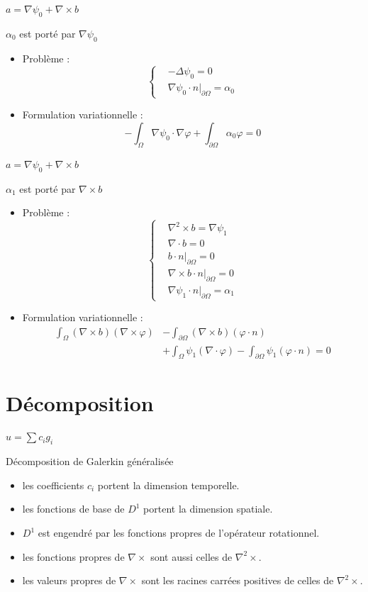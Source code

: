 \documentclass{beamer}
\newcommand{\grad}{{\nabla}}
\newcommand{\laplace}{{\Delta}}
\newcommand{\rot}{{\nabla\times}}
\newcommand{\rott}{{\nabla^2\times}}
\newcommand{\diverg}{{\nabla\cdot}}
\newcommand{\restr}{{\big\rvert_{\partial\Omega}}}
\begin{document}
\begin{frame}{$a=\grad\psi_0+\rot b$}
\begin{block}{$\alpha_0$ est porté par $\grad\psi_0$}
\begin{itemize}
\item Problème :
\[\left\{
\begin{aligned}
&-\laplace\psi_0 = 0\\
&\grad\psi_0\cdot n\restr=\alpha_0
\end{aligned}
\right.\]
\item Formulation variationnelle :
\[
-\int_\Omega \grad\psi_0\cdot\grad\varphi + \int_{\partial\Omega} \alpha_0\varphi = 0
\]
\end{itemize}
\end{block}
\end{frame}

\begin{frame}{$a=\grad\psi_0+\rot b$}
\begin{block}{$\alpha_1$ est porté par $\rot b$}
\begin{itemize}
\item Problème :
\[\left\{
\begin{aligned}
&\rott b = \grad\psi_1\\
&\diverg b = 0\\
&b\cdot n\restr = 0\\
&\rot b\cdot n\restr = 0\\
&\grad\psi_1\cdot n\restr = \alpha_1
\end{aligned}
\right.\]
\item Formulation variationnelle :
\begin{align*}
\int_\Omega (\rot b)(\rot\varphi) &- \int_{\partial\Omega} (\rot b)(\varphi\cdot n) \\
&+\int_\Omega \psi_1(\diverg\varphi) - \int_{\partial\Omega} \psi_1(\varphi\cdot n) = 0
\end{align*}
\end{itemize}
\end{block}
\end{frame}

\section{Décomposition}
\begin{frame}{$u=\sum c_ig_i$}
\begin{block}{Décomposition de Galerkin généralisée}
\begin{itemize}
\item les coefficients $c_i$ portent la dimension temporelle.
\item les fonctions de base de $D^1$ portent la dimension spatiale.
\item $D^1$ est engendré par les fonctions propres de l'opérateur rotationnel.
\item les fonctions propres de $\rot$ sont aussi celles de $\rott$.
\item les valeurs propres de $\rot$ sont les racines carrées positives de celles de $\rott$.
\end{itemize}
\end{block}
\end{frame}
\end{document}
